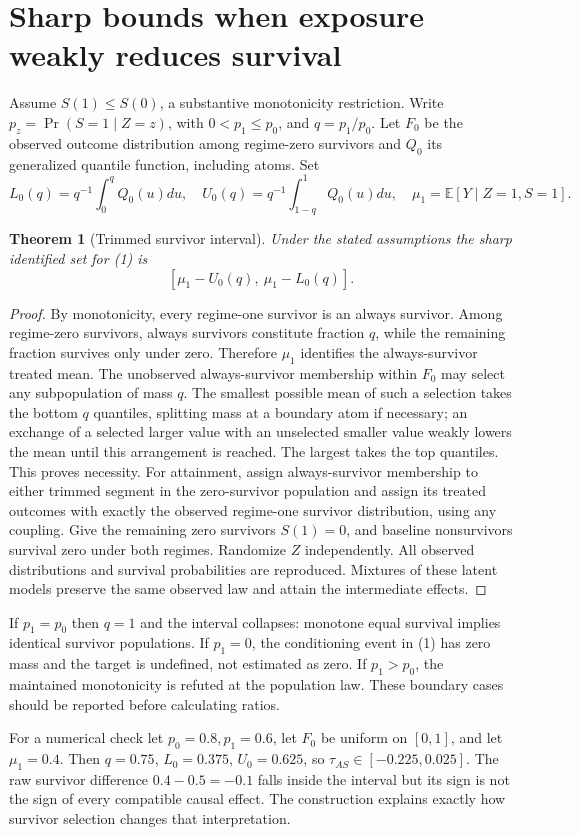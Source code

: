\documentclass[11pt]{article}
\newtheorem{theorem}{Theorem}
\theoremstyle{definition}
\newcommand{\E}{\mathbb E}
\begin{document}
\section*{Sharp bounds when exposure weakly reduces survival}
Assume $S(1)\le S(0)$, a substantive monotonicity restriction. Write
$p_z=\Pr(S=1\mid Z=z)$, with $0<p_1\le p_0$, and
$q=p_1/p_0$. Let $F_0$ be the observed outcome distribution among regime-zero
survivors and $Q_0$ its generalized quantile function, including atoms.
Set
\[
 L_0(q)=q^{-1}\int_0^q Q_0(u)du,\quad
 U_0(q)=q^{-1}\int_{1-q}^1 Q_0(u)du,\quad
 \mu_1=\E[Y\mid Z=1,S=1].
\]
\begin{theorem}[Trimmed survivor interval]
Under the stated assumptions the sharp identified set for (1) is
\[
 [\mu_1-U_0(q),\ \mu_1-L_0(q)].                         \tag{2}
\]
\end{theorem}
\begin{proof}
By monotonicity, every regime-one survivor is an always survivor. Among
regime-zero survivors, always survivors constitute fraction $q$, while the
remaining fraction survives only under zero. Therefore $\mu_1$ identifies
the always-survivor treated mean. The unobserved always-survivor membership
within $F_0$ may select any subpopulation of mass $q$. The smallest possible
mean of such a selection takes the bottom $q$ quantiles, splitting mass at
a boundary atom if necessary; an exchange of a selected larger value with an
unselected smaller value weakly lowers the mean until this arrangement is
reached. The largest takes the top quantiles. This proves necessity.
For attainment, assign always-survivor membership to either trimmed segment
in the zero-survivor population and assign its treated outcomes with exactly
the observed regime-one survivor distribution, using any coupling. Give the
remaining zero survivors $S(1)=0$, and baseline nonsurvivors survival zero
under both regimes. Randomize $Z$ independently. All observed distributions
and survival probabilities are reproduced. Mixtures of these latent models
preserve the same observed law and attain the intermediate effects.
\end{proof}
If $p_1=p_0$ then $q=1$ and the interval collapses: monotone equal survival
implies identical survivor populations. If $p_1=0$, the conditioning event in
(1) has zero mass and the target is undefined, not estimated as zero. If
$p_1>p_0$, the maintained monotonicity is refuted at the population law.
These boundary cases should be reported before calculating ratios.

For a numerical check let $p_0=0.8,p_1=0.6$, let $F_0$ be uniform on $[0,1]$,
and let $\mu_1=0.4$. Then $q=0.75$, $L_0=0.375$, $U_0=0.625$, so
$\tau_{AS}\in[-0.225,0.025]$. The raw survivor difference $0.4-0.5=-0.1$
falls inside the interval but its sign is not the sign of every compatible
causal effect. The construction explains exactly how survivor selection changes
that interpretation.
\end{document}
